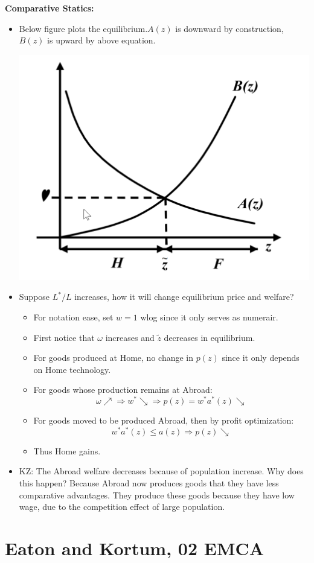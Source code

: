 \documentclass{book}
\theoremstyle{plain}
\theoremstyle{definition}
\newcommand{\mytitle}[1]{{\large{\textbf{#1}}}}
\begin{document}
\mytitle{Comparative Statics:}
\begin{itemize}
	\item Below figure plots the equilibrium.$A(z)$ is downward by construction, $B(z)$ is upward by above equation.

	\includegraphics[width=0.5\linewidth]{images/ricardian.png}
	\item Suppose $L^*/L$ increases, how it will change equilibrium price and welfare?
	\begin{itemize}
		\item For notation ease, set $w=1$ wlog since it only serves as numerair.
		\item First notice that $\omega$ increases and $\tilde z$ decreases in equilibrium.
		\item For goods produced at Home, no change in $p(z)$ since it only depends on Home technology.
		\item For goods whose production remains at Abroad:
		\[\omega \nearrow \Rightarrow w^{*} \searrow \Rightarrow p(z)=w^{*} a^{*}(z) \searrow\]
		\item For goods moved to be produced Abroad, then by profit optimization:
		\[w^{*} a^{*}(z) \leq a(z) \Rightarrow p(z) \searrow\]
		\item Thus Home gains.
	\end{itemize}
	\item KZ: The Abroad welfare decreases because of population increase. Why does this happen? Because Abroad now produces goods that they have less comparative advantages. They produce these goods because they have low wage, due to the competition effect of large population.

\end{itemize}





\section{Eaton and Kortum, 02 EMCA} %
\label{sec:eaton_and_kortum_02_emca}
\end{document}
